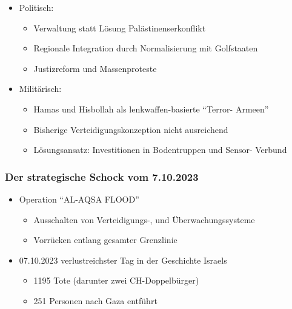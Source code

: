 {}\documentclass[a4paper]{article}
\providecommand{\tightlist}{\setlength{\itemsep}{1mm}\setlength{\parskip}{1mm}}
\begin{document}
\begin{itemize}
	\tightlist
	\item
	      Politisch:

	      \begin{itemize}
		      \tightlist
		      \item
		            Verwaltung statt Lösung Palästinenserkonflikt
		      \item
		            Regionale Integration durch Normalisierung mit Golfstaaten
		      \item
		            Justizreform und Massenproteste
	      \end{itemize}
	\item
	      Militärisch:

	      \begin{itemize}
		      \tightlist
		      \item
		            Hamas und Hisbollah als lenkwaffen-basierte ``Terror- Armeen''
		      \item
		            Bisherige Verteidigungskonzeption nicht ausreichend
		      \item
		            Lösungsansatz: Investitionen in Bodentruppen und Sensor- Verbund
	      \end{itemize}
\end{itemize}

\subsubsection{Der strategische Schock vom
	7.10.2023}\label{der-strategische-schock-vom-7.10.2023}

\begin{itemize}
	\tightlist
	\item
	      Operation ``AL-AQSA FLOOD''

	      \begin{itemize}
		      \tightlist
		      \item
		            Ausschalten von Verteidigungs-, und Überwachungssysteme
		      \item
		            Vorrücken entlang gesamter Grenzlinie
	      \end{itemize}
	\item
	      07.10.2023 verlustreichster Tag in der Geschichte Israels

	      \begin{itemize}
		      \tightlist
		      \item
		            1195 Tote (darunter zwei CH-Doppelbürger)
		      \item
		            251 Personen nach Gaza entführt
	      \end{itemize}
\end{itemize}
\end{document}
